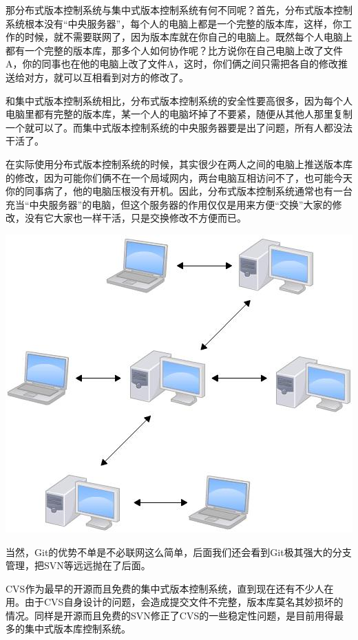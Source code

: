 \documentclass[•]{article}
\begin{document}
\begin{CJK}{UTF8}{gbsn}
\qquad 那分布式版本控制系统与集中式版本控制系统有何不同呢？首先，分布式版本控制系统根本没有“中央服务器”，每个人的电脑上都是一个完整的版本库，这样，你工作的时候，就不需要联网了，因为版本库就在你自己的电脑上。既然每个人电脑上都有一个完整的版本库，那多个人如何协作呢？比方说你在自己电脑上改了文件A，你的同事也在他的电脑上改了文件A，这时，你们俩之间只需把各自的修改推送给对方，就可以互相看到对方的修改了。

\qquad 和集中式版本控制系统相比，分布式版本控制系统的安全性要高很多，因为每个人电脑里都有完整的版本库，某一个人的电脑坏掉了不要紧，随便从其他人那里复制一个就可以了。而集中式版本控制系统的中央服务器要是出了问题，所有人都没法干活了。

\qquad 在实际使用分布式版本控制系统的时候，其实很少在两人之间的电脑上推送版本库的修改，因为可能你们俩不在一个局域网内，两台电脑互相访问不了，也可能今天你的同事病了，他的电脑压根没有开机。因此，分布式版本控制系统通常也有一台充当“中央服务器”的电脑，但这个服务器的作用仅仅是用来方便“交换”大家的修改，没有它大家也一样干活，只是交换修改不方便而已。
\begin{center}
\includegraphics[scale=0.6]{3.jpeg}
\end{center}
\qquad 当然，Git的优势不单是不必联网这么简单，后面我们还会看到Git极其强大的分支管理，把SVN等远远抛在了后面。

\qquad CVS作为最早的开源而且免费的集中式版本控制系统，直到现在还有不少人在用。由于CVS自身设计的问题，会造成提交文件不完整，版本库莫名其妙损坏的情况。同样是开源而且免费的SVN修正了CVS的一些稳定性问题，是目前用得最多的集中式版本库控制系统。


\end{CJK}
\end{document}
